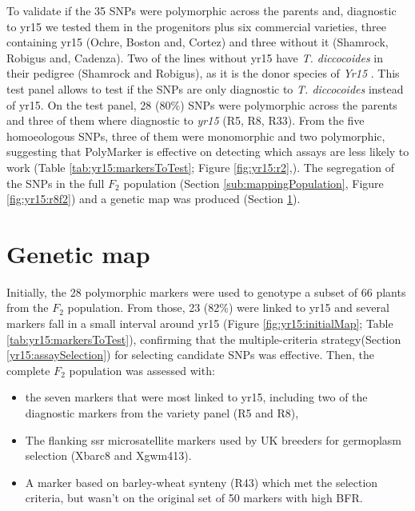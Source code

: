 

To validate if the 35 SNPs were polymorphic across the parents and, diagnostic to \acrshort{yr15} we tested them in the progenitors plus six commercial varieties, three containing \acrshort{yr15} (Ochre, Boston and, Cortez) and three without it (Shamrock, Robigus and, Cadenza).
Two of the lines without \acrshort{yr15} have \textit{T. diccocoides} in their pedigree (Shamrock and Robigus), as it is the donor species of \textit{Yr15} \citep{mcintosh1995}. 
This test panel allows to test if the SNPs are only diagnostic to \textit{T. diccocoides} instead of \acrshort{yr15}.
On the test panel, 28 ($80\%$) SNPs were polymorphic across the parents and three of them where diagnostic to \textit{yr15} (R5, R8, R33).
From the five homoeologous SNPs, three of them were monomorphic and two polymorphic, suggesting that PolyMarker is effective on detecting which assays are less likely to work (Table \ref{tab:yr15:markersToTest}; Figure \ref{fig:yr15:r2},).
The segregation of the SNPs in the full $F_{2}$ population (Section \ref{sub:mappingPopulation}, Figure \ref{fig:yr15:r8f2}) and a genetic map was produced (Section \ref{yr15:geneticMap}).   



\section{Genetic map} 
\label{yr15:geneticMap}


Initially, the 28 polymorphic markers were used to genotype a subset of 66 plants from the $F_{2}$ population. 
From those, 23 (82\%) were linked to \acrshort{yr15} and several markers fall in a small interval around \acrshort{yr15} (Figure \ref{fig:yr15:initialMap}; Table \ref{tab:yr15:markersToTest}), confirming that the multiple-criteria strategy(Section \ref{yr15:assaySelection}) for selecting candidate SNPs was effective. 
Then, the complete $F_{2}$ population was assessed with:
\begin{itemize}	
	\item  the seven markers that were most linked to \acrshort{yr15}, including two of the diagnostic markers from the variety panel (R5 and R8),
	\item The flanking \acrshort{ssr} microsatellite markers used by UK breeders for germoplasm selection (Xbarc8 and Xgwm413).  
	\item A marker based on barley-wheat synteny (R43) which met the selection criteria, but wasn't on the original set of 50 markers with high BFR. 
\end{itemize}

